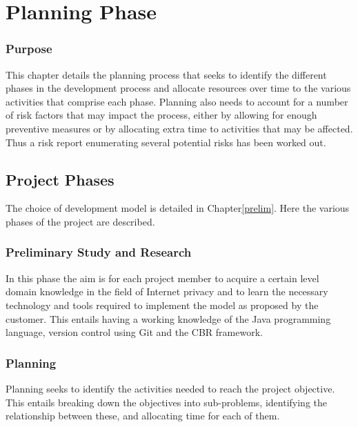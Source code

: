  

\chapter{Planning Phase}
\label{plan}

\minitoc 

\subsection*{Purpose}
This chapter details the planning process that seeks to identify the different phases in the development process and allocate resources over time to the various activities that comprise each phase. Planning also needs to account for a number of risk factors that may impact the process, either by allowing for enough preventive measures or by allocating extra time to activities that may be affected. Thus a risk report enumerating several potential risks has been worked out.

\section{Project Phases}\label{phases}
The choice of development model is detailed in Chapter\ref{prelim}. Here the various phases of the project are described.

\subsection{Preliminary Study and Research}
In this phase the aim is for each project member to acquire a certain level domain knowledge in the field of Internet privacy and to learn the necessary technology and tools required to implement the model as proposed by the customer. This entails having a working knowledge of the Java programming language, version control using Git and the CBR framework.

\subsection{Planning}
Planning seeks to identify the activities needed to reach the project objective. This entails breaking down the objectives into sub-problems, identifying the relationship between these, and allocating time for each of them. 

